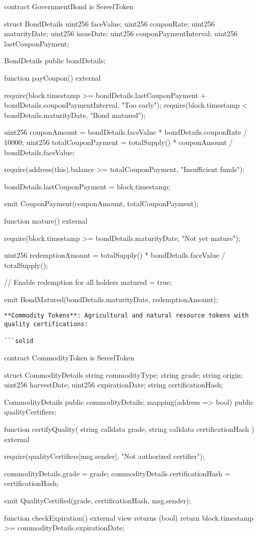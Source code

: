 \documentclass[12pt]{article}
\begin{document}
contract GovernmentBond is SereelToken {    struct BondDetails {        uint256 faceValue;        uint256 couponRate;        uint256 maturityDate;        uint256 issueDate;        uint256 couponPaymentInterval;        uint256 lastCouponPayment;    }

    BondDetails public bondDetails;

    function payCoupon() external {        require(block.timestamp >= bondDetails.lastCouponPayment + bondDetails.couponPaymentInterval, "Too early");        require(block.timestamp < bondDetails.maturityDate, "Bond matured");

        uint256 couponAmount = bondDetails.faceValue * bondDetails.couponRate / 10000;        uint256 totalCouponPayment = totalSupply() * couponAmount / bondDetails.faceValue;

        require(address(this).balance >= totalCouponPayment, "Insufficient funds");

        bondDetails.lastCouponPayment = block.timestamp;

        emit CouponPayment(couponAmount, totalCouponPayment);    }

    function mature() external {        require(block.timestamp >= bondDetails.maturityDate, "Not yet mature");

        uint256 redemptionAmount = totalSupply() * bondDetails.faceValue / totalSupply();

        // Enable redemption for all holders        matured = true;

        emit BondMatured(bondDetails.maturityDate, redemptionAmount);    }}
\begin{lstlisting}
**Commodity Tokens**: Agricultural and natural resource tokens with quality certifications:

```solid
\end{lstlisting}
contract CommodityToken is SereelToken {    struct CommodityDetails {        string commodityType;        string grade;        string origin;        uint256 harvestDate;        uint256 expirationDate;        string certificationHash;    }

    CommodityDetails public commodityDetails;    mapping(address => bool) public qualityCertifiers;

    function certifyQuality(        string calldata grade,        string calldata certificationHash    ) external {        require(qualityCertifiers[msg.sender], "Not authorized certifier");

        commodityDetails.grade = grade;        commodityDetails.certificationHash = certificationHash;

        emit QualityCertified(grade, certificationHash, msg.sender);    }

    function checkExpiration() external view returns (bool) {        return block.timestamp >= commodityDetails.expirationDate;    }}
\end{document}
